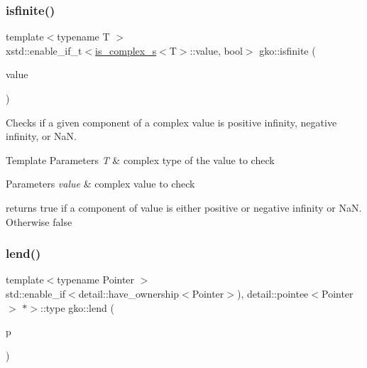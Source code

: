 \subsubsection{\texorpdfstring{isfinite()}{isfinite()}}
{\footnotesize\ttfamily template$<$typename T $>$ \\
xstd\+::enable\+\_\+if\+\_\+t$<$\hyperlink{namespacegko_aeede19206954d5c8ebd04c95cf63bb88}{is\+\_\+complex\+\_\+s}$<$T$>$\+::value, bool$>$ gko\+::isfinite (\begin{DoxyParamCaption}\item[{const T \&}]{value }\end{DoxyParamCaption})\hspace{0.3cm}{\ttfamily [inline]}}



Checks if a given component of a complex value is positive infinity, negative infinity, or NaN. 


\begin{DoxyTemplParams}{Template Parameters}
{\em T} & complex type of the value to check\\
\hline
\end{DoxyTemplParams}

\begin{DoxyParams}{Parameters}
{\em value} & complex value to check\\
\hline
\end{DoxyParams}
returns {\ttfamily true} if a component of value is either positive or negative infinity or NaN. Otherwise {\ttfamily false} \mbox{\label{namespacegko_aa8cb4876b72e5e1036ea9575443c439b}} 
\subsubsection{\texorpdfstring{lend()}{lend()}\hspace{0.1cm}{\footnotesize\ttfamily [1/2]}}
{\footnotesize\ttfamily template$<$typename Pointer $>$ \\
std\+::enable\+\_\+if$<$detail\+::have\+\_\+ownership$<$Pointer$>$), detail\+::pointee$<$Pointer$>$ $\ast$$>$\+::type gko\+::lend (\begin{DoxyParamCaption}\item[{const Pointer \&}]{p }\end{DoxyParamCaption})\hspace{0.3cm}{\ttfamily [inline]}}




